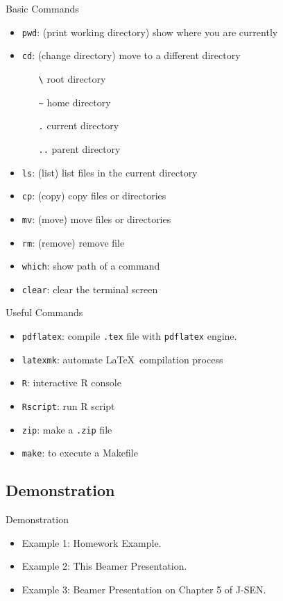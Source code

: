 \documentclass{beamer}
\begin{document}
\begin{frame}{Basic Commands}
	\begin{itemize}
		\item \texttt{pwd}: (print working directory) show where you are currently
		\item \texttt{cd}: (change directory) move to a different directory
			\begin{itemize}
				\item[\texttt{\textbackslash}] root directory
				\item[\texttt{\~}] home directory
				\item[\texttt{.}] current directory
				\item[\texttt{..}] parent directory
			\end{itemize}
		\item \texttt{ls}: (list) list files in the current directory
		\item \texttt{cp}: (copy) copy files or directories
		\item \texttt{mv}: (move) move files or directories
		\item \texttt{rm}: (remove) remove file 
		\item \texttt{which}: show path of a command
		\item \texttt{clear}: clear the terminal screen
	\end{itemize}
\end{frame}

\begin{frame}{Useful Commands}
	\begin{itemize}
		\item \texttt{pdflatex}: compile \texttt{.tex} file with \texttt{pdflatex} engine.
		\item \texttt{latexmk}: automate \LaTeX\ compilation process
		\item \texttt{R}: interactive R console
		\item \texttt{Rscript}: run R script
		\item \texttt{zip}: make a \texttt{.zip} file
		\item \texttt{make}: to execute a Makefile
	\end{itemize}
\end{frame}

\subsection{Demonstration}

\begin{frame}{Demonstration}
	\begin{itemize}
		\item Example 1: Homework Example.
		\item Example 2: This Beamer Presentation.
		\item Example 3: Beamer Presentation on Chapter 5 of J-SEN.
	\end{itemize}
\end{frame}
\end{document}
